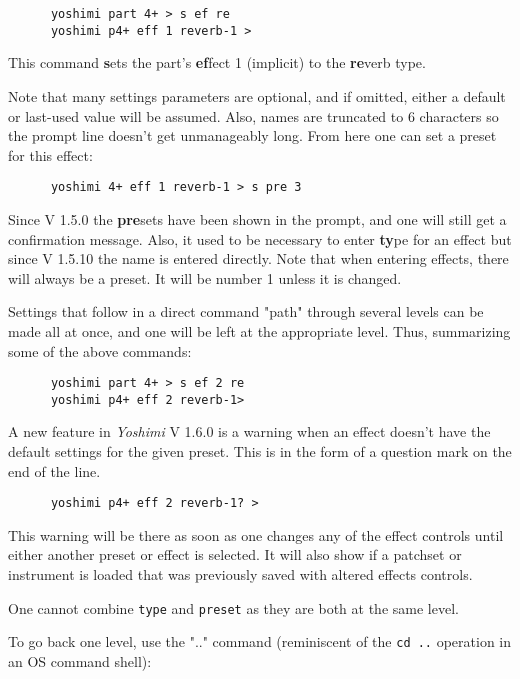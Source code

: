    \begin{verbatim}
      yoshimi part 4+ > s ef re
      yoshimi p4+ eff 1 reverb-1 >
   \end{verbatim}

   This command \textbf{s}ets the part's \textbf{ef}fect 1 (implicit) to
   the \textbf{re}verb type.

   Note that many settings parameters are optional, and if omitted,
   either a default or last-used value will be assumed. Also, names are
   truncated to 6 characters so the prompt line doesn't get unmanageably long.
   From here one can set a preset for this effect:

   \begin{verbatim}
      yoshimi 4+ eff 1 reverb-1 > s pre 3
   \end{verbatim}

   Since V 1.5.0 the \textbf{pre}sets have been shown in the prompt, and one
   will still get a confirmation message. Also, it used to be necessary to
   enter \textbf{ty}pe for an effect but since V 1.5.10 the name is entered directly.
   Note that when entering effects, there will always be a preset. It will be number 1
   unless it is changed.

   Settings that follow in a direct command "path" through several levels
   can be made all at once, and one will be left at the appropriate level.
   Thus, summarizing some of the above commands:

   \begin{verbatim}
      yoshimi part 4+ > s ef 2 re
      yoshimi p4+ eff 2 reverb-1>
   \end{verbatim}

   A new feature in \textsl{Yoshimi} V 1.6.0 is a warning when an effect doesn't have the default
   settings for the given preset. This is in the form of a question mark on the end of the line.
   \begin{verbatim}
      yoshimi p4+ eff 2 reverb-1? >
   \end{verbatim}
   This warning will be there as soon as one changes any of the effect controls until either
   another preset or effect is selected. It will also show if a patchset or instrument is loaded
   that was previously saved with altered effects controls.

   One cannot combine \texttt{type} and \texttt{preset} as they
   are both at the same level.

   To go back one level, use the ".." command (reminiscent of the \texttt{cd ..} operation in an OS command shell):

